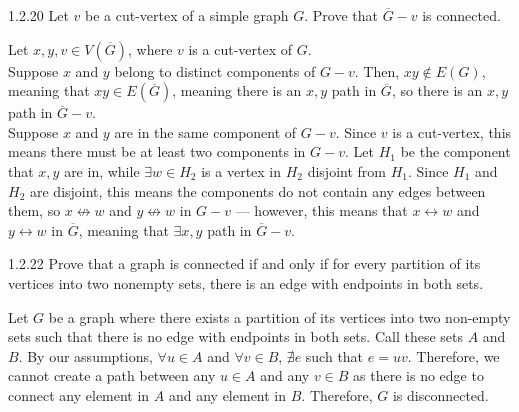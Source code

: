 \documentclass[9pt,twocolumn]{extarticle}
\title{}
\author{Avinash Iyer}
\date{}
\begin{document}
{
\begin{problem}{1.2.20}
  Let $v$ be a cut-vertex of a simple graph $G$. Prove that $\overline{G} - v$ is connected.
\end{problem}
\begin{solution}
  Let $x,y,v\in V(\overline{G})$, where $v$ is a cut-vertex of $G$.\\

  Suppose $x$ and $y$ belong to distinct components of $G-v$. Then, $xy\not\in E(G)$, meaning that $xy\in E(\overline{G})$, meaning there is an $x,y$ path in $\overline{G}$, so there is an $x,y$ path in $\overline{G}-v$.\\

  Suppose $x$ and $y$ are in the same component of $G-v$. Since $v$ is a cut-vertex, this means there must be at least two components in $G-v$. Let $H_1$ be the component that $x,y$ are in, while $\exists w\in H_2$ is a vertex in $H_2$ disjoint from $H_1$. Since $H_1$ and $H_2$ are disjoint, this means the components do not contain any edges between them, so $x\not\leftrightarrow w$ and $y\not\leftrightarrow w$ in $G-v$ --- however, this means that $x\leftrightarrow w$ and $y\leftrightarrow w$ in $\overline{G}$, meaning that $\exists x,y$ path in $\overline{G} - v$.
\end{solution}
\begin{problem}{1.2.22}
  Prove that a graph is connected if and only if for every partition of its vertices into two nonempty sets, there is an edge with endpoints in both sets. 
\end{problem}
\begin{solution}
  Let $G$ be a graph where there exists a partition of its vertices into two non-empty sets such that there is no edge with endpoints in both sets. Call these sets $A$ and $B$. By our assumptions, $\forall u\in A$ and $\forall v\in B$, $\nexists e$ such that $e = uv$. Therefore, we cannot create a path between any $u\in A$ and any $v\in B$ as there is no edge to connect any element in $A$ and any element in $B$. Therefore, $G$ is disconnected.\\


\end{solution}}
\end{document}
